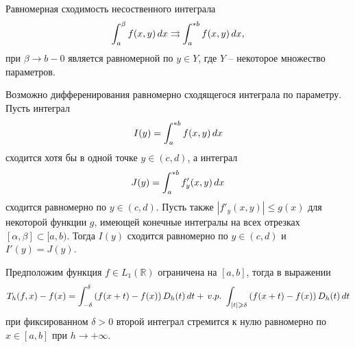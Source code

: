 



\begin{to_def}
    Равномерная сходимость несоственного интеграла
    \begin{equation*}
        \int_a^\beta f(x, y) \, d x \rightrightarrows \int_a^{*b} f(x, y) \, d x,
    \end{equation*}
    при $\beta \to b -0$ является равномерной по $y \in Y$, где $Y$ -- некоторое множество параметров. 
\end{to_def}

\begin{to_lem}
    Возможно дифференирования равномерно сходящегося интеграла по параметру. Пусть интеграл
    \begin{equation*}
        I(y) = \int_{a}^{*b} f(x, y) \, d x
    \end{equation*}
    сходится хотя бы в одной точке $y \in (c, d)$, а интеграл 
    \begin{equation*}
        J(y) = \int_{a}^{*b} f_y' (x, y) \, d x
    \end{equation*}
    сходится равномерно по $y \in (c, d)$. Пусть также $|f'_y (x, y) | \leq g(x)$ для некоторой функции $g$, имеющей конечные интегралы на всех отрезках $[\alpha, \beta] \subset [a, b)$. Тогда $I(y)$ сходится равномерно по $y \in (c, d)$ и $I'(y) = J(y)$. 
\end{to_lem}



\begin{to_thr}[]
    Предположим функция $f \in L_1 (\mathbb{R})$ ограничена на $[a, b]$, тогда в выражении
    \begin{equation*}
        T_h (f, x) - f(x) = \int_{-\delta}^{\delta} \left(
            f(x+t) - f(x)
        \right) D_h (t) \d t + \, v.p. \ 
        \int_{|t| \geq \delta} \left(
            f(x+t) - f(x)
        \right) D_h (t) \d t
    \end{equation*}
    при фиксированном $\delta > 0$ второй интеграл стремится к нулю равномерно по $x\in [a, b]$ при $h \to + \infty$. 
\end{to_thr}


